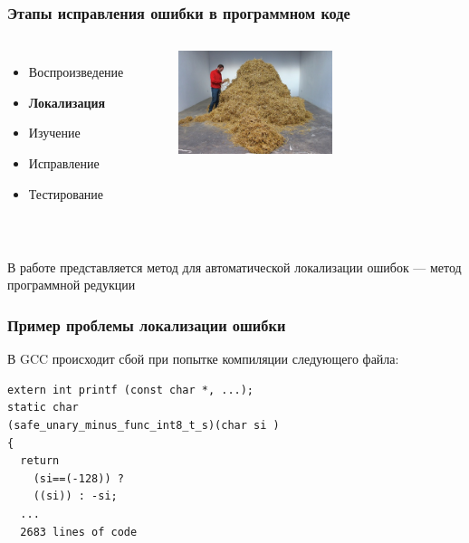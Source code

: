 


\begin{frame}
	\frametitle{Этапы исправления ошибки в программном коде}
	\begin{columns}[t,onlytextwidth]
	\begin{itemize}
		\item Воспроизведение
		\item \textbf{Локализация}
		\item Изучение
		\item Исправление
		\item Тестирование
	\end{itemize}
	\begin{figure}
		\includegraphics[width=45mm]{image/igolka.jpg}
	\end{figure}	
	\end{columns}
	\ \\ 
	\center
	В работе представляется метод для автоматической локализации ошибок --- метод программной редукции
\end{frame}



\begin{frame}[fragile]
	\frametitle{Пример проблемы локализации ошибки}
	В GCC происходит сбой при попытке компиляции следующего файла:
	\begin{lstlisting}[style =crs_cpp]
extern int printf (const char *, ...);
static char
(safe_unary_minus_func_int8_t_s)(char si )
{
  return
    (si==(-128)) ?
    ((si)) : -si;
  ...
  2683 lines of code
\end{lstlisting}
\end{frame}



